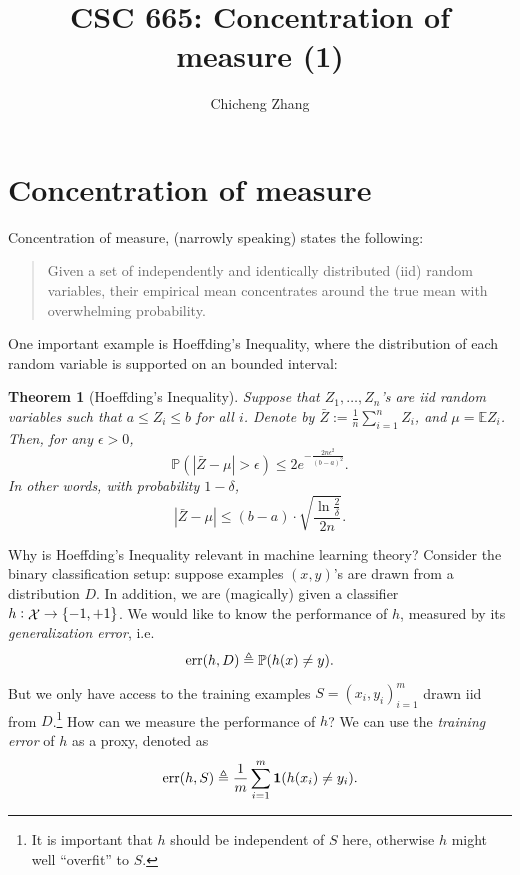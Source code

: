 \documentclass{article}
\title{CSC 665: Concentration of measure (1)}
\author{Chicheng Zhang}
\newtheorem{theorem}{Theorem}
\DeclareMathOperator*{\err}{{\rm err}}
\DeclareMathOperator*{\Xcal}{{\cal X}}
\newcommand{\EE}{\mathbb{E}} %
\newcommand{\PP}{\mathbb{P}} %
\newcommand{\defeq}{\triangleq}
\newcommand*{\one}{{\bf 1}}
\begin{document}
\maketitle

\section{Concentration of measure}

Concentration of measure, (narrowly speaking) states the following:
\begin{quote}
Given a set of independently and identically distributed (iid) random variables,
their empirical mean concentrates around the true mean with overwhelming probability.
\end{quote}

One important example is Hoeffding's Inequality, where the distribution of each random variable is supported on an bounded interval:
\begin{theorem}[Hoeffding's Inequality]
Suppose that $Z_1, \ldots, Z_n$'s are iid random variables such that $a \leq Z_i \leq b$ for all $i$. Denote by $\bar{Z} := \frac 1 n \sum_{i=1}^n Z_i$, and $\mu = \EE Z_i$. Then, for any $\epsilon > 0$,
\begin{equation}
 \PP( |\bar{Z} - \mu| > \epsilon ) \leq 2 e^{-\frac{2n\epsilon^2}{(b-a)^2}}.
\label{eqn:hoef}
\end{equation}
In other words, with probability $1-\delta$,
\begin{equation}
 |\bar{Z} - \mu| \leq (b-a) \cdot \sqrt{\frac{\ln\frac{2}{\delta}}{2n}}.
\label{eqn:hoef-conc}
\end{equation}
\label{thm:hoef}
\end{theorem}

Why is Hoeffding's Inequality relevant in machine learning theory? Consider the binary classification setup: suppose examples $(x,y)$'s are drawn from a distribution $D$. In addition, we are (magically) given a classifier
$h: \Xcal \to \cbr{-1,+1}$. We would like to know the performance of $h$, measured by
its {\em generalization error}, i.e.
\[ \err(h, D) \defeq \PP(h(x) \neq y). \]

But we only have access to the training examples $S = {(x_i, y_i)}_{i=1}^m$ drawn iid from $D$.\footnote{It is important that $h$ should be independent of $S$ here, otherwise $h$ might well ``overfit'' to $S$.} How can we measure the performance of $h$? We can use the {\em training error} of $h$ as a proxy, denoted as
\[ \err(h, S) \defeq \frac{1}{m} \sum_{i=1}^m \one(h(x_i) \neq y_i). \]
\end{document}
